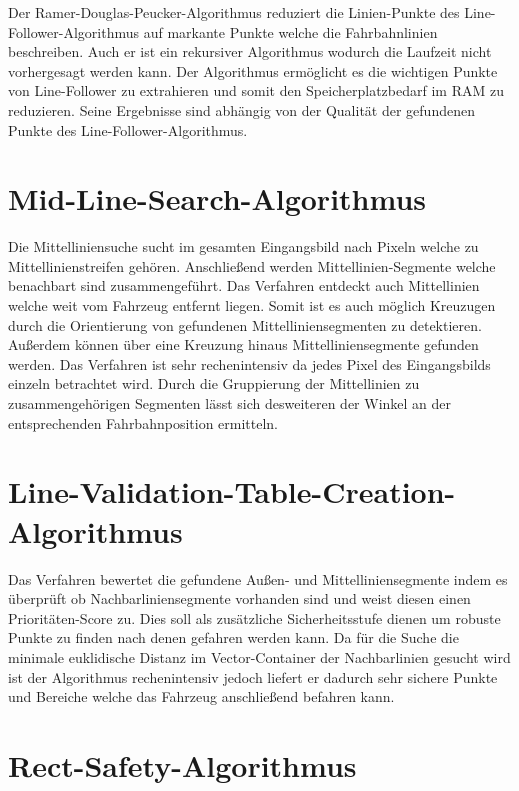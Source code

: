 Der Ramer-Douglas-Peucker-Algorithmus reduziert die Linien-Punkte des Line-Follower-Algorithmus auf markante Punkte welche die Fahrbahnlinien beschreiben. Auch er ist ein rekursiver Algorithmus wodurch die Laufzeit nicht vorhergesagt werden kann. Der Algorithmus erm\"oglicht es die wichtigen Punkte von Line-Follower zu extrahieren und somit den Speicherplatzbedarf im RAM zu reduzieren. Seine Ergebnisse sind abh\"angig von der Qualit\"at der gefundenen Punkte des Line-Follower-Algorithmus. 

\section{Mid-Line-Search-Algorithmus}
\label{section:Mid-Line-Search-Algorithmus}
Die Mittelliniensuche sucht im gesamten Eingangsbild nach Pixeln welche zu Mittellinienstreifen geh\"oren. Anschlie{\ss}end werden Mittellinien-Segmente welche benachbart sind zusammengef\"uhrt. Das Verfahren entdeckt auch Mittellinien welche weit vom Fahrzeug entfernt liegen. Somit ist es auch m\"oglich Kreuzugen durch die Orientierung von gefundenen Mittelliniensegmenten zu detektieren. Au{\ss}erdem k\"onnen \"uber eine Kreuzung hinaus Mittelliniensegmente gefunden werden. Das Verfahren ist sehr rechenintensiv da jedes Pixel des Eingangsbilds einzeln betrachtet wird. Durch die Gruppierung der Mittellinien zu zusammengeh\"origen Segmenten l\"asst sich desweiteren der Winkel an der entsprechenden Fahrbahnposition ermitteln.

\section{Line-Validation-Table-Creation-Algorithmus}
\label{section:Line-Validation-Table-Creation-Algorithmus}

Das Verfahren bewertet die gefundene Au{\ss}en- und Mittelliniensegmente indem es \"uberpr\"uft ob Nachbarliniensegmente vorhanden sind und weist diesen einen Priorit{\"a}ten-Score zu. Dies soll als zus\"atzliche Sicherheitsstufe dienen um robuste Punkte zu finden nach denen gefahren werden kann. Da f{\"u}r die Suche die minimale euklidische Distanz im Vector-Container der Nachbarlinien gesucht wird ist der Algorithmus rechenintensiv jedoch liefert er dadurch sehr sichere Punkte und Bereiche welche das Fahrzeug anschlie{\ss}end befahren kann.  

\section{Rect-Safety-Algorithmus}
\label{section:Rect-Safety-Algorithmus}

